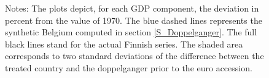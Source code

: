 \documentclass[12pt]{article}
\newcommand{\annote}[1]{\parbox{\textwidth}{\renewcommand{\baselinestretch}{1.0}\vspace{12pt} \small Notes: #1}}
\begin{document}
\begin{figure}[h!]
    \annote{The plots depict, for each GDP component, the deviation in percent from the value of 1970. The blue dashed lines represents the synthetic Belgium computed in section \ref{S_Doppelganger}. The full black lines stand for the actual Finnish series. The shaded area corresponds to two standard deviations of the difference between the treated country and the doppelganger prior to the euro accession. }
\end{figure}
\end{document}

